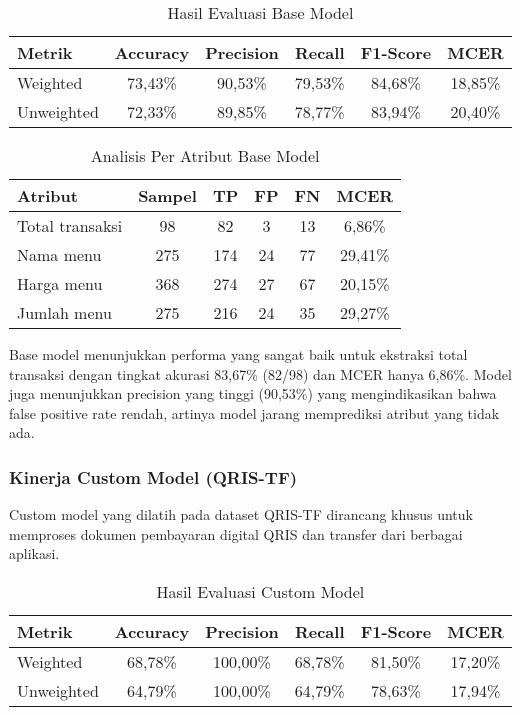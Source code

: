 \begin{table}[htbp]
\centering
\caption{Hasil Evaluasi Base Model}
\label{tab:base-model-results}
\begin{tabular}{|l|c|c|c|c|c|}
\hline
\textbf{Metrik} & \textbf{Accuracy} & \textbf{Precision} & \textbf{Recall} & \textbf{F1-Score} & \textbf{MCER} \\
\hline
Weighted & 73,43\% & 90,53\% & 79,53\% & 84,68\% & 18,85\% \\
\hline
Unweighted & 72,33\% & 89,85\% & 78,77\% & 83,94\% & 20,40\% \\
\hline
\end{tabular}
\end{table}

\begin{table}[htbp]
\centering
\caption{Analisis Per Atribut Base Model}
\label{tab:base-model-detail}
\begin{tabular}{|l|c|c|c|c|c|}
\hline
\textbf{Atribut} & \textbf{Sampel} & \textbf{TP} & \textbf{FP} & \textbf{FN} & \textbf{MCER} \\
\hline
Total transaksi & 98 & 82 & 3 & 13 & 6,86\% \\
\hline
Nama menu & 275 & 174 & 24 & 77 & 29,41\% \\
\hline
Harga menu & 368 & 274 & 27 & 67 & 20,15\% \\
\hline
Jumlah menu & 275 & 216 & 24 & 35 & 29,27\% \\
\hline
\end{tabular}
\end{table}

Base model menunjukkan performa yang sangat baik untuk ekstraksi total transaksi dengan tingkat akurasi 83,67\% (82/98) dan MCER hanya 6,86\%. Model juga menunjukkan precision yang tinggi (90,53\%) yang mengindikasikan bahwa false positive rate rendah, artinya model jarang memprediksi atribut yang tidak ada.

\subsubsection{Kinerja Custom Model (QRIS-TF)}
Custom model yang dilatih pada dataset QRIS-TF dirancang khusus untuk memproses dokumen pembayaran digital QRIS dan transfer dari berbagai aplikasi.

\begin{table}[htbp]
\centering
\caption{Hasil Evaluasi Custom Model}
\label{tab:custom-model-results}
\begin{tabular}{|l|c|c|c|c|c|}
\hline
\textbf{Metrik} & \textbf{Accuracy} & \textbf{Precision} & \textbf{Recall} & \textbf{F1-Score} & \textbf{MCER} \\
\hline
Weighted & 68,78\% & 100,00\% & 68,78\% & 81,50\% & 17,20\% \\
\hline
Unweighted & 64,79\% & 100,00\% & 64,79\% & 78,63\% & 17,94\% \\
\hline
\end{tabular}
\end{table}

